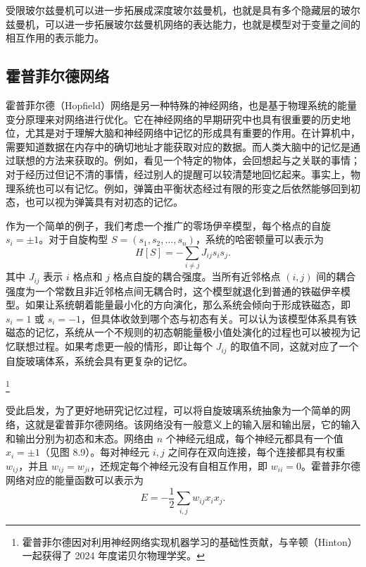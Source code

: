 受限玻尔兹曼机可以进一步拓展成深度玻尔兹曼机，也就是具有多个隐藏层的玻尔兹曼机，可以进一步拓展玻尔兹曼机网络的表达能力，也就是模型对于变量之间的相互作用的表示能力。

\subsection{霍普菲尔德网络}
霍普菲尔德（Hopfield）网络是另一种特殊的神经网络，也是基于物理系统的能量变分原理来对网络进行优化。它在神经网络的早期研究中也具有很重要的历史地位，尤其是对于理解大脑和神经网络中记忆的形成具有重要的作用。在计算机中，需要知道数据在内存中的确切地址才能获取对应的数据。而人类大脑中的记忆是通过联想的方法来获取的。例如，看见一个特定的物体，会回想起与之关联的事情；对于经历过但记不清的事情，经过别人的提醒可以较清楚地回忆起来。事实上，物理系统也可以有记忆。例如，弹簧由平衡状态经过有限的形变之后依然能够回到初态，也可以视为弹簧具有对初态的记忆。

作为一个简单的例子，我们考虑一个推广的零场伊辛模型，每个格点的自旋 $s_i=\pm1$。对于自旋构型 $S=(s_1,s_2,\ldots,s_n)$，系统的哈密顿量可以表示为
\begin{equation}
H[S]=-\sum_{i\ne j}J_{ij}s_i s_j.
\tag{8.3.34}
\end{equation}
其中 $J_{ij}$ 表示 $i$ 格点和 $j$ 格点自旋的耦合强度。当所有近邻格点 $(i,j)$ 间的耦合强度为一个常数且非近邻格点间无耦合时，这个模型就退化到普通的铁磁伊辛模型。如果让系统朝着能量最小化的方向演化，那么系统会倾向于形成铁磁态，即 $s_i=1$ 或 $s_i=-1$，但具体收敛到哪个态与初态有关。可以认为该模型体系具有铁磁态的记忆，系统从一个不规则的初态朝能量极小值处演化的过程也可以被视为记忆联想过程。如果考虑更一般的情形，即让每个 $J_{ij}$ 的取值不同，这就对应了一个自旋玻璃体系，系统会具有更复杂的记忆。

\footnote{霍普菲尔德因对利用神经网络实现机器学习的基础性贡献，与辛顿（Hinton）一起获得了 2024 年度诺贝尔物理学奖。}

受此启发，为了更好地研究记忆过程，可以将自旋玻璃系统抽象为一个简单的网络，这就是霍普菲尔德网络。该网络没有一般意义上的输入层和输出层，它的输入和输出分别为初态和末态。网络由 $n$ 个神经元组成，每个神经元都具有一个值 $x_i=\pm1$（见图 8.9）。每对神经元 $i,j$ 之间存在双向连接，每个连接都具有权重 $w_{ij}$，并且 $w_{ij}=w_{ji}$，还规定每个神经元没有自相互作用，即 $w_{ii}=0$。霍普菲尔德网络对应的能量函数可以表示为
\begin{equation}
E=-\frac12\sum_{i,j}w_{ij}x_i x_j.
\tag{8.3.35}
\end{equation}

